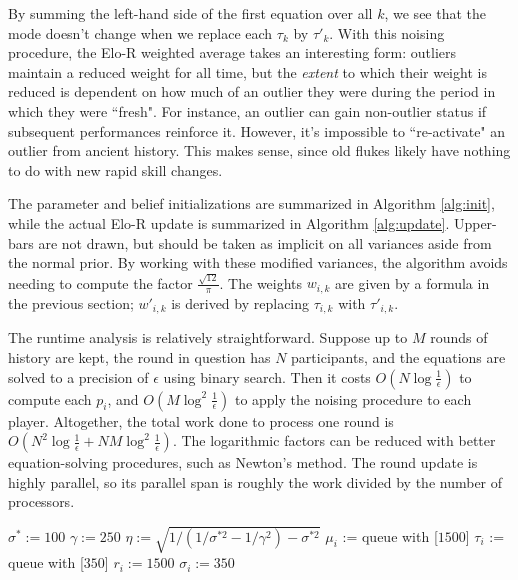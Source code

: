 \documentclass{article}
\begin{document}
By summing the left-hand side of the first equation over all $k$, we see that the mode doesn't change when we replace each $\tau_k$ by $\tau'_k$. With this noising procedure, the Elo-R weighted average takes an interesting form: outliers maintain a reduced weight for all time, but the \textit{extent} to which their weight is reduced is dependent on how much of an outlier they were during the period in which they were ``fresh". For instance, an outlier can gain non-outlier status if subsequent performances reinforce it. However, it's impossible to ``re-activate" an outlier from ancient history. This makes sense, since old flukes likely have nothing to do with new rapid skill changes.

The parameter and belief initializations are summarized in Algorithm \ref{alg:init}, while the actual Elo-R update is summarized in Algorithm \ref{alg:update}. Upper-bars are not drawn, but should be taken as implicit on all variances aside from the normal prior. By working with these modified variances, the algorithm avoids needing to compute the factor $\frac{\sqrt{12}}{\pi}$. The weights $w_{i,k}$ are given by a formula in the previous section; $w'_{i,k}$ is derived by replacing $\tau_{i,k}$ with $\tau'_{i,k}$.

The runtime analysis is relatively straightforward. Suppose up to $M$ rounds of history are kept, the round in question has $N$ participants, and the equations are solved to a precision of $\epsilon$ using binary search. Then it costs $O(N\log\frac 1\epsilon)$ to compute each $p_i$, and $O(M\log^2\frac 1\epsilon)$ to apply the noising procedure to each player. Altogether, the total work done to process one round is $O(N^2\log\frac 1\epsilon + NM\log^2\frac 1\epsilon)$. The logarithmic factors can be reduced with better equation-solving procedures, such as Newton's method. The round update is highly parallel, so its parallel span is roughly the work divided by the number of processors.

\begin{algorithm}
\caption{$init()$}
\label{alg:init}
\begin{algorithmic}
\STATE $\sigma^* := 100$
\STATE $\gamma := 250$
\STATE $\eta := \sqrt{1 / \left( 1/\sigma^{*2} - 1/\gamma^2 \right) - \sigma^{*2}}$
\STATE $\mu_i$ := queue with [$1500$]
\STATE $\tau_i$ := queue with [$350$]
\STATE $r_i := 1500$
\STATE $\sigma_i := 350$
\ENDFOR
\end{algorithmic}
\end{algorithm}
\end{document}
